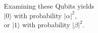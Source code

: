 \documentclass[preview]{standalone}
\begin{document}
\begin{center}
Examining these Qubits yields \\ $ | 0 \rangle $ with probability $ | \alpha |^2 $, \\ or $ |1 \rangle$ with probability $|\beta|^2$.
\end{center}
\end{document}
